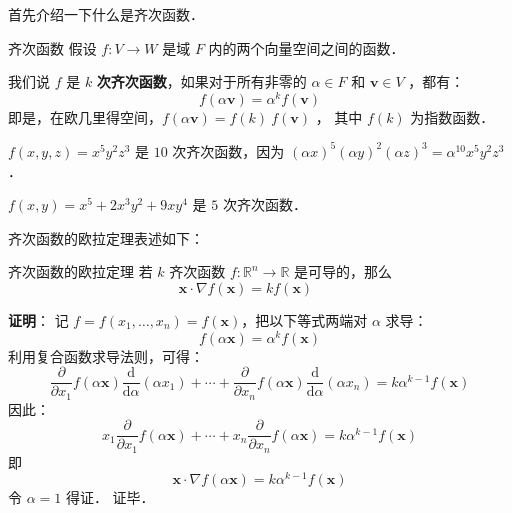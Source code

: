 
\begin{issues}
\end{issues}



首先介绍一下什么是齐次函数．

\begin{definition}{齐次函数}
假设 $f: V \to W $ 是域 $ F $ 内的两个向量空间之间的函数．

我们说 $f$ 是 $k$ \textbf{次齐次函数}，如果对于所有非零的 $\alpha \in F$ 和 $\mathbf{v} \in V$ ，都有：
\begin{equation}
f(\alpha \mathbf{v}) = \alpha^k f(\mathbf{v}) 
\end{equation}
即是，在欧几里得空间，$f(\alpha \mathbf{v}) = f(k) \ f(\mathbf{v})$ ， 其中 $f(k)$ 为指数函数．
\end{definition}

\begin{example}{}
$f(x,y,z)=x^5y^2z^3$ 是 $10$ 次齐次函数，因为 $(\alpha x)^5(\alpha y)^2(\alpha z)^3=\alpha^{10}x^5y^2z^3$．

$f(x,y)=x^5 + 2 x^3 y^2 + 9 x y^4$ 是 $5$ 次齐次函数．
\end{example}

齐次函数的欧拉定理表述如下：

\begin{theorem}{齐次函数的欧拉定理}
若 $k$ 齐次函数 $ f:\mathbb{R}^n \to \mathbb{R}$ 是可导的，那么
\begin{equation}
{\displaystyle \mathbf {x} \cdot \nabla f(\mathbf {x} )=kf(\mathbf {x} )\qquad }
\end{equation}
\end{theorem}
\textbf{证明}： 记 $f=f(x_{1},\ldots ,x_{n})=f(\mathbf {x} )$，把以下等式两端对 $\alpha$ 求导：
\begin{equation}
{\displaystyle f(\alpha \mathbf {x} )=\alpha ^{k}f(\mathbf {x} )}
\end{equation}
利用复合函数求导法则，可得：
\begin{equation}
{\frac {\partial }{\partial x_{1}}}f(\alpha \mathbf {x} ){\frac {\mathrm {d} }{\mathrm {d} \alpha }}(\alpha x_{1})+\cdots +{\frac {\partial }{\partial x_{n}}}f(\alpha \mathbf {x} ){\frac {\mathrm {d} }{\mathrm {d} \alpha }}(\alpha x_{n})=k\alpha ^{k-1}f(\mathbf {x} )
\end{equation}
因此：
\begin{equation}
x_{1}{\frac {\partial }{\partial x_{1}}}f(\alpha \mathbf {x} )+\cdots +x_{n}{\frac {\partial }{\partial x_{n}}}f(\alpha \mathbf {x} )=k\alpha ^{k-1}f(\mathbf {x} )
\end{equation}
即
\begin{equation}
\mathbf {x} \cdot \nabla f(\alpha \mathbf {x} )=k\alpha ^{k-1}f(\mathbf {x} )
\end{equation}
令 $\alpha=1$ 得证． 证毕．

